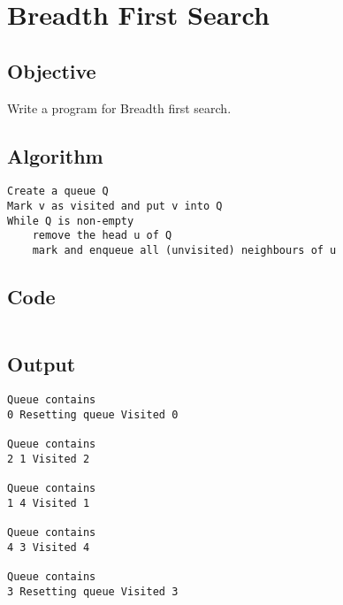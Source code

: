 \section{Breadth First Search}
\label{sec:Breadth First Search}

\subsection{Objective}
Write a program for Breadth first search.

\subsection{Algorithm}
\begin{lstlisting}[style=mystyle]
Create a queue Q 
Mark v as visited and put v into Q 
While Q is non-empty 
    remove the head u of Q 
    mark and enqueue all (unvisited) neighbours of u
\end{lstlisting}

\subsection{Code}
\inputminted[]{c}{../../Code/bfs.c}

\subsection{Output}
\begin{lstlisting}[style=output]
Queue contains 
0 Resetting queue Visited 0

Queue contains 
2 1 Visited 2

Queue contains 
1 4 Visited 1

Queue contains 
4 3 Visited 4

Queue contains 
3 Resetting queue Visited 3
\end{lstlisting}

\pagebreak

